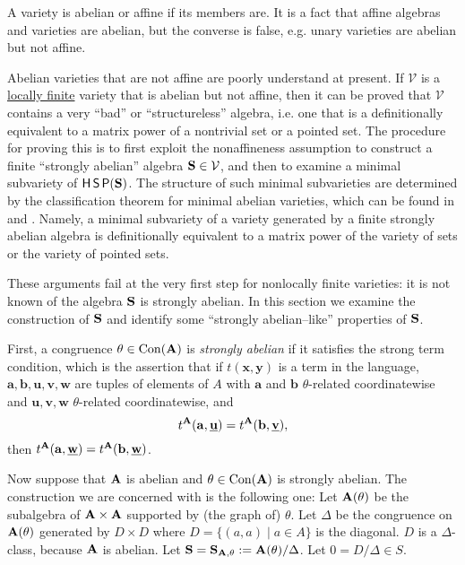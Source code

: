A variety is abelian or affine if its members are.
It is a fact that affine algebras and varieties are abelian,
but the converse is false, e.g. unary varieties are abelian
but not affine.

Abelian varieties that are not affine are poorly understand
at present. If $\mathcal V$ is a \underline{locally finite} variety that 
is abelian but not affine, then it can be proved that $\mathcal V$
contains a very ``bad'' or ``structureless'' algebra, i.e.
one that is a definitionally equivalent
to a matrix power of a nontrivial set or a pointed set.
The procedure for proving this is to first exploit
the nonaffineness assumption to construct
a finite ``strongly abelian'' algebra ${{\mathbf{\uppercase{s}}}}\in \mathcal V$,
and then to examine a minimal subvariety of $\operatorname{\mathsf{H}}\operatorname{\mathsf{S}}\operatorname{\mathsf{P}}({{\mathbf{\uppercase{s}}}})$.
The structure of such minimal subvarieties are determined
by the classification theorem for minimal abelian varieties,
which can be found in 
\cite{kkv1} and \cite{szendrei}. Namely, a minimal subvariety
of a variety generated by a finite strongly abelian algebra
is definitionally
equivalent to a matrix power of the variety of sets
or the variety of pointed sets.

These arguments fail at the very first step
for nonlocally finite varieties: it is not known of the
algebra ${{\mathbf{\uppercase{s}}}}$ is strongly abelian. In this section we examine
the construction of ${{\mathbf{\uppercase{s}}}}$
and identify some ``strongly abelian--like''
properties of ${{\mathbf{\uppercase{s}}}}$.

First, a congruence $\theta\in\operatorname{Con}({{\mathbf{\uppercase{a}}}})$ is \emph{strongly abelian}
if it satisfies the strong term condition,
which is the assertion that if $t({{\mathbf{{x}}}},{{\mathbf{{y}}}})$ is a term
in the language, ${{\mathbf{{a}}}}, {{\mathbf{{b}}}}, {{\mathbf{{u}}}}, {{\mathbf{{v}}}}, {{\mathbf{{w}}}}$
are tuples of elements of $A$ with ${{\mathbf{{a}}}}$ and ${{\mathbf{{b}}}}$
$\theta$-related coordinatewise and
${{\mathbf{{u}}}}, {{\mathbf{{v}}}}, {{\mathbf{{w}}}}$
$\theta$-related coordinatewise, and
\[
t^{{{\mathbf{\uppercase{a}}}}}({{\mathbf{{a}}}},\underline{{{\mathbf{{u}}}}}) = t^{{{\mathbf{\uppercase{a}}}}}({{\mathbf{{b}}}},\underline{{{\mathbf{{v}}}}}), 
\]
then
$t^{{{\mathbf{\uppercase{a}}}}}({{\mathbf{{a}}}},\underline{{{\mathbf{{w}}}}}) = t^{{{\mathbf{\uppercase{a}}}}}({{\mathbf{{b}}}},\underline{{{\mathbf{{w}}}}})$.

Now suppose that ${{\mathbf{\uppercase{a}}}}$ is abelian
and $\theta\in\operatorname{Con}({{\mathbf{\uppercase{a}}}})$ is strongly abelian.
The construction we are concerned with is the following one:
Let ${{\mathbf{\uppercase{a}}}}(\theta)$ be the subalgebra of ${{\mathbf{\uppercase{a}}}}\times {{\mathbf{\uppercase{a}}}}$
supported by (the graph of) $\theta$.
Let $\Delta$ be the congruence on ${{\mathbf{\uppercase{a}}}}(\theta)$ 
generated by $D\times D$ where $D = \{(a,a)\;|\;a\in A\}$
is the diagonal. 
$D$ is a $\Delta$-class, because ${{\mathbf{\uppercase{a}}}}$ is abelian.
Let ${{\mathbf{\uppercase{s}}}} = {{\mathbf{\uppercase{s}}}}_{{{\mathbf{\uppercase{a}}}},\theta} := {{\mathbf{\uppercase{a}}}}(\theta)/\Delta$.
Let $0 = D/\Delta\in S$.

